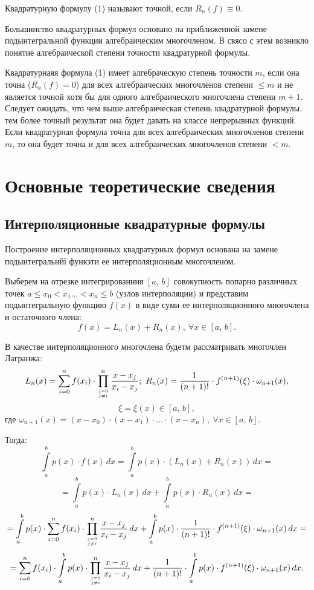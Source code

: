 \documentclass[14pt,a4paper,titlepage]{extarticle}
\begin{document}
Квадратурную формулу (1) называют точной, если $R_n(f)\equiv 0.$


Большинство квадратурных формул основано на приближенной замене подынтегральной функции алгебраическим многочленом. В свясо с этем возникло понятие алгебраической степени точности квадратурной формулы.

Квадратурнаяя формула (1) имеет алгебраческую степень точности $m$, если она точна ($R_n(f)=0$) для всех алгебраических многочленов степени $\leqslant m$ и не является точной хотя бы для одного алгебраического многочлена степени $m+1.$\\
Следует ожидать, что чем выше алгебраическая степень квадратурной формулы, тем
более точный результат она будет давать на классе непрерывных функций. Если квадратурная формула точна для всех алгебраических многочленов степени $m$, то она будет точна и для всех алгебраических многочленов степени $<m.$

{\centering\section{Основные теоретические сведения}}
{\centering\subsection{Интерполяционные квадратурные формулы}}

Построение интерполяционных квадратурных формул основана на замене подынтегральнйї функэти ее интерполяционным многочленом.

Выберем на отрезке интегрированния $[a,\, b]$ совокупность попарно различных точек $a\leqslant x_0<x_1\ldots <x_n\leqslant b$ (узлов интерполяции) и представим подынтегральную функцию $f(x)$ в виде суми ее интерполяционного многочлена и остаточного члена:
$$f(x)=L_n(x)+R_n(x),\ \forall x\in [a,\, b].$$

В качестве интерполяционного многочлена будетм рассматривать многочлен Лагранжа:
$$L_n(x)=\sum_{i=0}^n f(x_i)\cdot\prod_{\genfrac{}{}{0pt}{}{j=0}{j\neq i}}^n\frac{x-x_j}{x_i-x_j};\ R_n(x)=\frac{1}{(n+1)!}\cdot f^{(n+1)}(\xi)\cdot \omega _{n+1}(x),$$
$$\xi=\xi (x)\in [a,\, b],$$
где $\omega _{n+1}(x) =(x-x_0)\cdot (x-x_1)\cdot\ldots\cdot (x-x_n),\ \forall x\in [a,\, b].$

Тогда: 
$$\int\limits_a^b p(x)\cdot f(x)\, dx=\int\limits_a^b p(x)\cdot (L_n(x)+R_n(x))\, dx=$$
$$=\int\limits_a^b p(x)\cdot L_n(x)\, dx+\int\limits_a^b p(x)\cdot R_n(x)\, dx=$$
$$=\int\limits_a^b p(x)\cdot\sum_{i=0}^n f(x_i)\cdot\prod_{\genfrac{}{}{0pt}{}{j=0}{j\neq i}}^n\frac{x-x_j}{x_i-x_j}\, dx+\int\limits_a^b p(x)\cdot\frac{1}{(n+1)!}\cdot f^{(n+1)}(\xi)\cdot \omega _{n+1}(x)\, dx=$$
$$
=\sum_{i=0}^n f(x_i)\cdot\int\limits_a^b p(x)\cdot\prod_{\genfrac{}{}{0pt}{}{j=0}{j\neq i}}^n\frac{x-x_j}{x_i-x_j}\, dx+\frac{1}{(n+1)!}\cdot\int\limits_a^b p(x)\cdot f^{(n+1)}(\xi)\cdot \omega _{n+1}(x)\, dx.
$$
\end{document}
